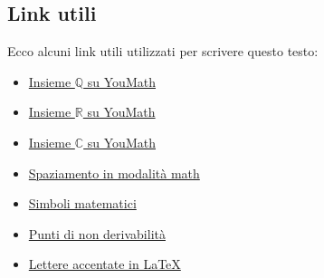 \documentclass[a4paper,14pt]{extarticle}
\newcommand{\R}{\mathbb{R}}
\newcommand{\Q}{\mathbb{Q}}
\newcommand{\C}{\mathbb{C}}
\begin{document}
\subsection{Link utili}
Ecco alcuni link utili utilizzati per scrivere questo testo: \\
\begin{itemize}
    \item \href{https://www.youmath.it/domande-a-risposte/view/6490-insieme-q.html}{Insieme $\Q$ su YouMath}
    \item \href{https://www.youmath.it/domande-a-risposte/view/6513-insieme-r.html}{Insieme $\R$ su YouMath}
    \item \href{https://www.youmath.it/lezioni/analisi-matematica/numeri-complessi.html}{Insieme $\C$ su YouMath}
    \item \href{https://www.overleaf.com/learn/latex/Spacing_in_math_mode}{Spaziamento in modalità math}
    \item \href{https://oeis.org/wiki/List_of_LaTeX_mathematical_symbols}{Simboli matematici}
    \item \href{https://www.youmath.it/lezioni/analisi-matematica/derivate/396-punti-di-non-derivabilita-punti-angolosi-cuspidi-flessi-a-tangente-verticale.html}{Punti di non derivabilità}
    \item \href{https://en.wikibooks.org/wiki/LaTeX/Special_Characters#Escaped_codes}{Lettere accentate in LaTeX}
\end{itemize}



\end{document}
